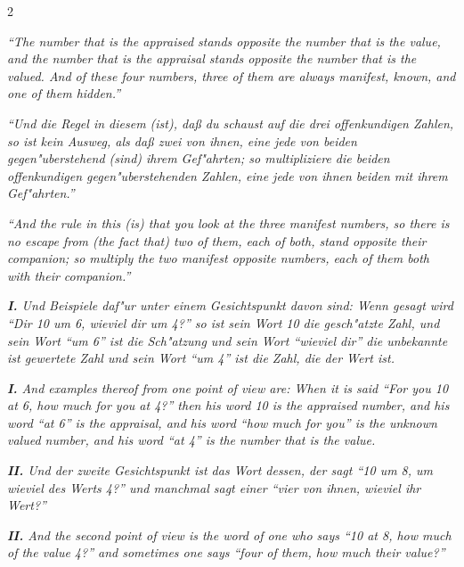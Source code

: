 \documentclass[10pt,a4paper]{article}
\newcommand{\enquote}[1]{``#1''}
\begin{document}
\begin{paracol}{2}
\switchcolumn

\textit{\enquote{The number that is the appraised stands opposite the number that is the value, and the number that is the appraisal stands opposite the number that is the valued. And of these four numbers, three of them are always manifest, known, and one of them hidden.}}

\switchcolumn*

\textit{\enquote{Und die Regel in diesem (ist), da\ss{} du schaust auf die drei offenkundigen Zahlen, so ist kein Ausweg, als da\ss{} zwei von ihnen, eine jede von beiden gegen"uberstehend (sind) ihrem Gef"ahrten; so multipliziere die beiden offenkundigen gegen"uberstehenden Zahlen, eine jede von ihnen beiden mit ihrem Gef"ahrten.}}

\switchcolumn

\textit{\enquote{And the rule in this (is) that you look at the three manifest numbers, so there is no escape from (the fact that) two of them, each of both, stand opposite their companion; so multiply the two manifest opposite numbers, each of them both with their companion.}}

\switchcolumn*

\textit{\textbf{I.} Und Beispiele daf"ur unter einem Gesichtspunkt davon sind: Wenn gesagt wird \enquote{Dir 10 um 6, wieviel dir um 4?} so ist sein Wort 10 die gesch"atzte Zahl, und sein Wort \enquote{um 6} ist die Sch"atzung und sein Wort \enquote{wieviel dir} die unbekannte ist gewertete Zahl und sein Wort \enquote{um 4} ist die Zahl, die der Wert ist.}

\switchcolumn

\textit{\textbf{I.} And examples thereof from one point of view are: When it is said \enquote{For you 10 at 6, how much for you at 4?} then his word 10 is the appraised number, and his word \enquote{at 6} is the appraisal, and his word \enquote{how much for you} is the unknown valued number, and his word \enquote{at 4} is the number that is the value.}

\switchcolumn*

\textit{\textbf{II.} Und der zweite Gesichtspunkt ist das Wort dessen, der sagt \enquote{10 um 8, um wieviel des Werts 4?} und manchmal sagt einer \enquote{vier von ihnen, wieviel ihr Wert?}}

\switchcolumn

\textit{\textbf{II.} And the second point of view is the word of one who says \enquote{10 at 8, how much of the value 4?} and sometimes one says \enquote{four of them, how much their value?}}


\end{paracol}
\end{document}
